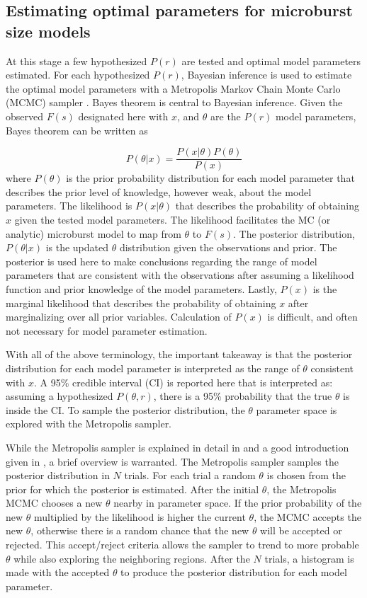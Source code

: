 \documentclass[draft]{agujournal2019}
\begin{document}
\subsection{Estimating optimal parameters for microburst size models}
At this stage a few hypothesized $P(r)$ are tested and optimal model parameters estimated. For each hypothesized $P(r)$, Bayesian inference is used to estimate the optimal model parameters with a Metropolis Markov Chain Monte Carlo (MCMC) sampler \cite{Metropolis1953}. Bayes theorem is central to Bayesian inference. Given the observed $F(s)$ designated here with $x$, and $\theta$  are the $P(r)$ model parameters, Bayes theorem can be written as

\begin{equation}
P(\theta | x) = \frac{P(x | \theta) P(\theta)}{P(x)}
\end{equation} where $P(\theta)$ is the prior probability distribution for each model parameter that describes the prior level of knowledge, however weak, about the model parameters. The likelihood is $P(x | \theta)$ that describes the probability of obtaining $x$ given the tested model parameters. The likelihood facilitates the MC (or analytic) microburst model to map from $\theta$ to $F(s)$. The posterior distribution, $P(\theta | x)$ is the updated $\theta$ distribution given the observations and prior. The posterior is used here to make conclusions regarding the range of model parameters that are consistent with the observations after assuming a likelihood function and prior knowledge of the model parameters. Lastly, $P(x)$ is the marginal likelihood that describes the probability of obtaining $x$ after marginalizing over all prior variables. Calculation of $P(x)$ is difficult, and often not necessary for model parameter estimation. 

With all of the above terminology, the important takeaway is that the posterior distribution for each model parameter is interpreted as the range of $\theta$ consistent with $x$. A 95\% credible interval (CI) is reported here that is interpreted as: assuming a hypothesized $P(\theta, r)$, there is a 95\% probability that the true $\theta$ is inside the CI. To sample the posterior distribution, the $\theta$ parameter space is explored with the Metropolis sampler.

While the Metropolis sampler is explained in detail in  and a good introduction given in , a brief overview is warranted. The Metropolis sampler samples the posterior distribution in $N$ trials. For each trial a random $\theta$ is chosen from the prior for which the posterior is estimated. After the initial $\theta$, the Metropolis MCMC chooses a new $\theta$ nearby in parameter space. If the prior probability of the new $\theta$ multiplied by the likelihood is higher the current $\theta$, the MCMC accepts the new $\theta$, otherwise there is a random chance that the new $\theta$ will be accepted or rejected. This accept/reject criteria allows the sampler to trend to more probable $\theta$ while also exploring the neighboring regions. After the $N$ trials, a histogram is made with the accepted $\theta$ to produce the posterior distribution for each model parameter.
\end{document}
